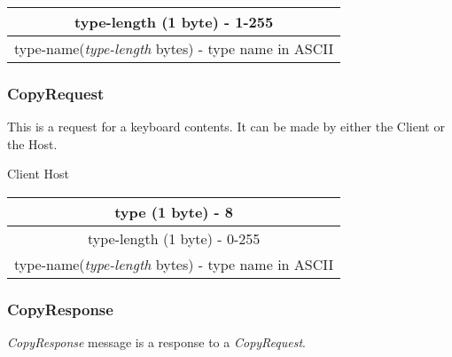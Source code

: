 \documentclass{article}
\begin{document}
    \begin{center}
        \begin{tabular}{|c|}
            \hline
            type-length (1 byte) - 1-255                             \\
            \hline
            type-name(\emph{type-length} bytes) - type name in ASCII \\
            \hline
        \end{tabular}
    \end{center}

    \subsubsection{CopyRequest}

    This is a request for a keyboard contents. It can be made by either the Client or the Host.

    \begin{center}
        Client \leftrightarrow Host\\
        \begin{tabular}{|c|}
            \hline
            type (1 byte) - 8                                        \\
            \hline
            type-length (1 byte) - 0-255                             \\
            \hline
            type-name(\emph{type-length} bytes) - type name in ASCII \\
            \hline
        \end{tabular}
    \end{center}

    \subsubsection{CopyResponse}

    \emph{CopyResponse} message is a response to a \emph{CopyRequest}.
\end{document}
